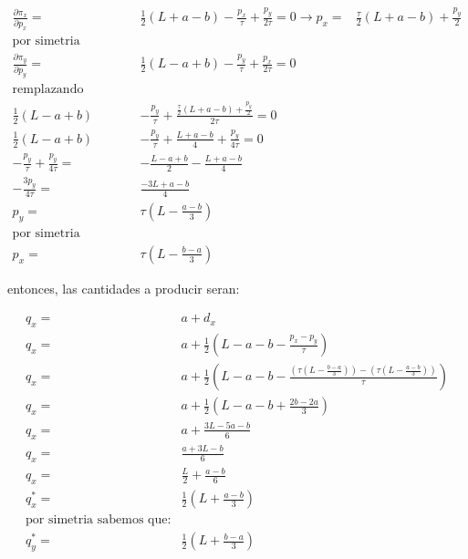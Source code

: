 \documentclass[11pt]{article}
\begin{document}
\begin{flushleft}
\begin{example}
        \begin{align*}
            \frac{\partial\pi_x}{\partial p_x} =& \frac{1}{2}\left( L+a-b\right)-\frac{p_x}{\tau}+\frac{p_y}{2\tau}=0\to p_x=&\frac{\tau}{2}\left( L+a-b\right)+\frac{p_y}{2}\\
            \text{por simetria sabemos que:}\\
            \frac{\partial\pi_y}{\partial p_y} =& \frac{1}{2}\left( L-a+b\right)-\frac{p_y}{\tau}+\frac{p_x}{2\tau}=0\\
            \text{remplazando obtenemos:}\\
            \frac{1}{2}\left( L-a+b\right)&-\frac{p_y}{\tau}+\frac{\frac{\tau}{2}\left( L+a-b\right)+\frac{p_y}{2}}{2\tau}=0\\
            \frac{1}{2}\left( L-a+b\right)&-\frac{p_y}{\tau}+\frac{L+a-b}{4}+\frac{p_y}{4\tau}=0\\
            -\frac{p_y}{\tau}+\frac{p_y}{4\tau}=&-\frac{L-a+b}{2}-\frac{L+a-b}{4}\\
            -\frac{3p_y}{4\tau}=&\frac{-3L+a-b}{4}\\
            p_y=&\tau\left( L - \frac{a-b}{3} \right)\\
            \text{por simetria sabemos que:}\\
            p_x=&\tau\left( L - \frac{b-a}{3} \right)
        \end{align*}
        
        entonces, las cantidades a producir seran:

        \begin{align*}
            q_x=&a+d_x\\
            q_x=&a+\frac{1}{2}\left( L-a-b-\frac{p_x-p_y}{\tau} \right)\\
            q_x=&a+\frac{1}{2}\left( L-a-b-\frac{\left( \tau\left( L - \frac{b-a}{3} \right) \right)-\left( \tau\left( L - \frac{a-b}{3} \right) \right)}{\tau} \right)\\
            q_x=&a+\frac{1}{2}\left( L-a-b+\frac{2b-2a}{3}\right)\\
            q_x=&a+\frac{3L-5a-b}{6}\\
            q_x=&\frac{a+3L-b}{6}\\
            q_x=&\frac{L}{2}+\frac{a-b}{6}\\
            q_x^*=&\frac{1}{2}\left( L + \frac{a-b}{3}\right)\\
            \text{por simetria sabemos que:}\\
            q_y^*=&\frac{1}{2}\left( L + \frac{b-a}{3}\right)
        \end{align*}
    \end{example}
\end{flushleft}
\end{document}
